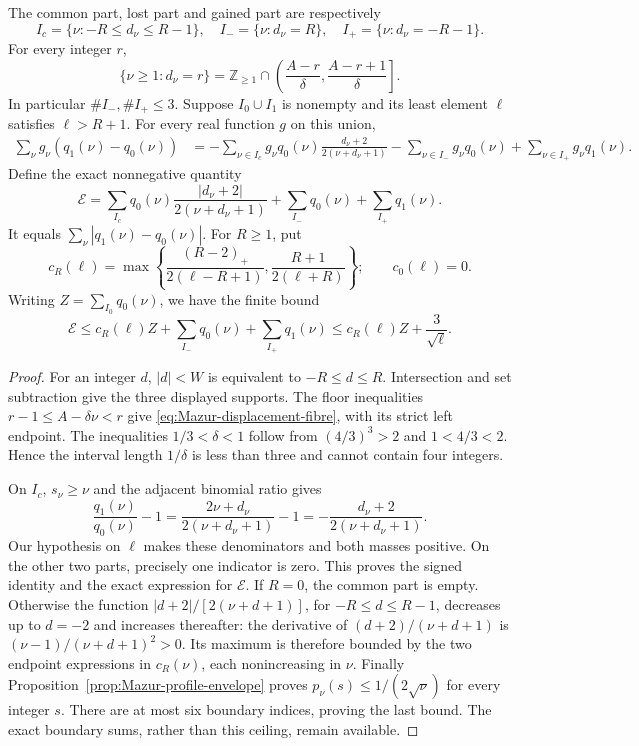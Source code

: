\begin{proposition}
\label{prop:Mazur-shift-support}
The common part, lost part and gained part are respectively
\[
 I_c=\{\nu:-R\le d_\nu\le R-1\},\quad
 I_-=\{\nu:d_\nu=R\},\quad I_+=\{\nu:d_\nu=-R-1\}.
\]
For every integer $r$,
\begin{equation}
 \{\nu\ge1:d_\nu=r\}
 =\mathbb Z_{\ge1}\cap
       \left(\frac{A-r}{\delta},\frac{A-r+1}{\delta}\right].
 \label{eq:Mazur-displacement-fibre}
\end{equation}
In particular $\#I_-,\#I_+\le3$. Suppose $I_0\cup I_1$ is nonempty
and its least element $\ell$ satisfies $\ell>R+1$. For every real
function $g$ on this union,
\begin{align}
 \sum_\nu g_\nu(q_1(\nu)-q_0(\nu))
 &=-\sum_{\nu\in I_c}g_\nu q_0(\nu)
       \frac{d_\nu+2}{2(\nu+d_\nu+1)}
       -\sum_{\nu\in I_-}g_\nu q_0(\nu)
       +\sum_{\nu\in I_+}g_\nu q_1(\nu).
 \label{eq:Mazur-shift-signed}
\end{align}
Define the exact nonnegative quantity
\[
 \mathcal E=
 \sum_{I_c}q_0(\nu)\frac{|d_\nu+2|}{2(\nu+d_\nu+1)}
       +\sum_{I_-}q_0(\nu)+\sum_{I_+}q_1(\nu).
\]
It equals $\sum_\nu|q_1(\nu)-q_0(\nu)|$. For $R\ge1$, put
\[
 c_R(\ell)=\max\left\{
 \frac{(R-2)_+}{2(\ell-R+1)},
 \frac{R+1}{2(\ell+R)}\right\};
 \qquad c_0(\ell)=0 .
\]
Writing $Z=\sum_{I_0}q_0(\nu)$, we have the finite bound
\begin{equation}
 \mathcal E\le c_R(\ell)Z+
       \sum_{I_-}q_0(\nu)+\sum_{I_+}q_1(\nu)
       \le c_R(\ell)Z+\frac3{\sqrt\ell}.
 \label{eq:Mazur-shift-envelope}
\end{equation}
\end{proposition}
\begin{proof}
For an integer $d$, $|d|<W$ is equivalent to $-R\le d\le R$.
Intersection and set subtraction give the three displayed supports.
The floor inequalities $r-1\le A-\delta\nu<r$ give
\eqref{eq:Mazur-displacement-fibre}, with its strict left endpoint.
The inequalities $1/3<\delta<1$ follow from
$(4/3)^3>2$ and $1<4/3<2$. Hence the interval length $1/\delta$
is less than three and cannot contain four integers.

On $I_c$, $s_\nu\ge\nu$ and the adjacent binomial ratio gives
\[
 \frac{q_1(\nu)}{q_0(\nu)}-1
 =\frac{2\nu+d_\nu}{2(\nu+d_\nu+1)}-1
 =-\frac{d_\nu+2}{2(\nu+d_\nu+1)} .
\]
Our hypothesis on $\ell$ makes these denominators and both masses
positive. On the other two parts, precisely one indicator is zero.
This proves the signed identity and the exact expression for
$\mathcal E$. If $R=0$, the common part is empty.
Otherwise the function $|d+2|/[2(\nu+d+1)]$, for
$-R\le d\le R-1$, decreases up to $d=-2$ and increases thereafter:
the derivative of $(d+2)/(\nu+d+1)$ is
$(\nu-1)/(\nu+d+1)^2>0$. Its maximum is therefore bounded by the
two endpoint expressions in $c_R(\nu)$, each nonincreasing in $\nu$.
Finally Proposition~\ref{prop:Mazur-profile-envelope} proves
$p_\nu(s)\le1/(2\sqrt\nu)$ for every integer $s$.
There are at most six boundary indices, proving the last bound.
The exact boundary sums, rather than this ceiling, remain available.
\end{proof}


